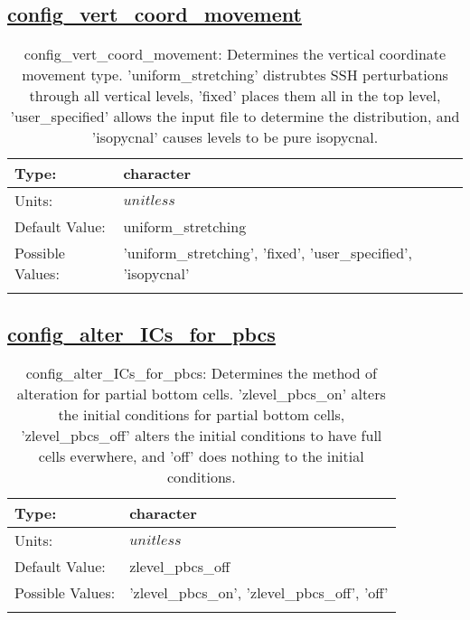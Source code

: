 \subsection[config\_vert\_coord\_movement]{\hyperref[sec:nm_tab_grid]{config\_vert\_coord\_movement}}
\label{subsec:nm_sec_config_vert_coord_movement}
\begin{center}
\begin{longtable}{| p{2.0in} | p{4.0in} |}
    \hline
    Type: & character \\
    \hline
    Units: & $unitless$ \\
    \hline
    Default Value: & uniform\_stretching \\
    \hline
    Possible Values: & 'uniform\_stretching', 'fixed', 'user\_specified', 'isopycnal' \\
    \hline
    \caption{config\_vert\_coord\_movement: Determines the vertical coordinate movement type. 'uniform\_stretching' distrubtes SSH perturbations through all vertical levels, 'fixed' places them all in the top level, 'user\_specified' allows the input file to determine the distribution, and 'isopycnal' causes levels to be pure isopycnal.}
\end{longtable}
\end{center}
\subsection[config\_alter\_ICs\_for\_pbcs]{\hyperref[sec:nm_tab_grid]{config\_alter\_ICs\_for\_pbcs}}
\label{subsec:nm_sec_config_alter_ICs_for_pbcs}
\begin{center}
\begin{longtable}{| p{2.0in} | p{4.0in} |}
    \hline
    Type: & character \\
    \hline
    Units: & $unitless$ \\
    \hline
    Default Value: & zlevel\_pbcs\_off \\
    \hline
    Possible Values: & 'zlevel\_pbcs\_on', 'zlevel\_pbcs\_off', 'off' \\
    \hline
    \caption{config\_alter\_ICs\_for\_pbcs: Determines the method of alteration for partial bottom cells. 'zlevel\_pbcs\_on' alters the initial conditions for partial bottom cells, 'zlevel\_pbcs\_off' alters the initial conditions to have full cells everwhere, and 'off' does nothing to the initial conditions.}
\end{longtable}
\end{center}
